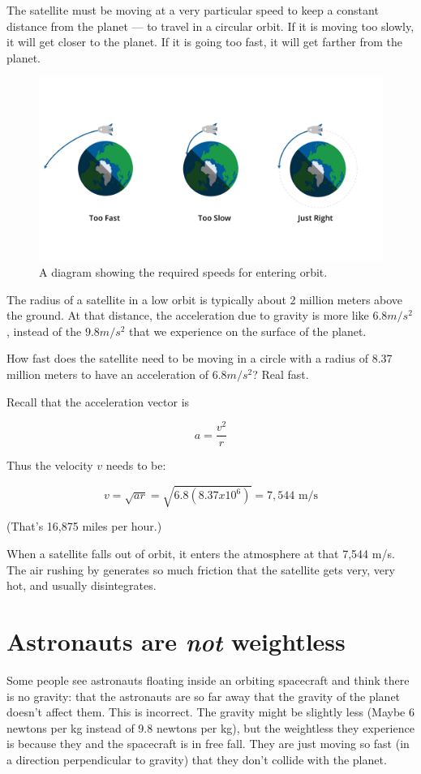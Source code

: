 The satellite must be moving at a very particular speed to keep a
constant distance from the planet --- to travel in a circular orbit.
If it is moving too slowly, it will get closer to the planet.  If it
is going too fast, it will get farther from the planet.
\begin{figure}[htbp]
    \centering
    \includegraphics[width=.75\textwidth]{orbitSpeeds.png}
    \caption{A diagram showing the required speeds for entering orbit.}
    \label{fig:orbitSpeeds}
\end{figure}

The radius of a satellite in a low orbit is typically about 2 million meters above the
ground. At that distance, the acceleration due to gravity is more like
$6.8 m/s^2$, instead of the $9.8 m/s^2$ that we experience on the
surface of the planet.

How fast does the satellite need to be moving in a circle with a
radius of 8.37 million meters to have an acceleration of $6.8 m/s^2$? Real fast.

Recall that the acceleration vector is

$$a = \frac{v^2}{r}$$

Thus the velocity $v$ needs to be:

$$v = \sqrt{a r} = \sqrt{6.8(8.37 x 10^6)} = 7,544 \text{ m/s}$$

(That's 16,875 miles per hour.)

When a satellite falls out of orbit, it enters the atmosphere at that
7,544 m/s.  The air rushing by generates so much friction that the
satellite gets very, very hot, and usually disintegrates.

\section{Astronauts are \emph{not} weightless}

Some people see astronauts floating inside an orbiting spacecraft and
think there is no gravity: that the astronauts are so far away that
the gravity of the planet doesn't affect them. This is incorrect.  The
gravity might be slightly less (Maybe 6 newtons per kg instead of 9.8
newtons per kg), but the weightless they experience is because they
and the spacecraft is in free fall.  They are just moving so fast (in
a direction perpendicular to gravity) that they don't collide with the
planet.


